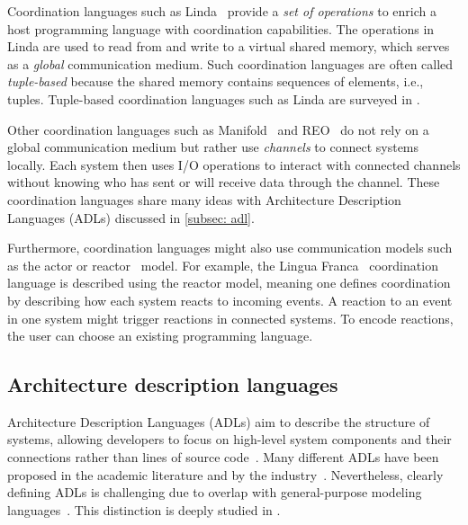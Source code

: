 \documentclass[runningheads]{llncs}
\begin{document}
Coordination languages such as Linda~\cite{carrieroLindaContext1989} provide a \textit{set of operations} to enrich a host programming language with coordination capabilities.
The operations in Linda are used to read from and write to a virtual shared memory, which serves as a \textit{global} communication medium.
Such coordination languages are often called \textit{tuple-based} because the shared memory contains sequences of elements, i.e., tuples.
Tuple-based coordination languages such as Linda are surveyed in \cite{rossiTuplebasedTechnologiesCoordination2001,nixonTuplespacebasedComputingSemantic2008,omiciniCoordinationModelsLanguages2011}.

Other coordination languages such as Manifold~\cite{arbabOverviewManifoldIts1993,papadopoulosModellingActivitiesInformation1998} and REO~\cite{arbabReoChannelbasedCoordination2004} do not rely on a global communication medium but rather use \textit{channels} to connect systems locally.
Each system then uses I/O operations to interact with connected channels without knowing who has sent or will receive data through the channel.
These coordination languages share many ideas with Architecture Description Languages (ADLs) discussed in \autoref{subsec: adl}.

Furthermore, coordination languages might also use communication models such as the actor or reactor~\cite{lohstrohReactorsDeterministicModel2020} model.
For example, the Lingua Franca~\cite{lohstrohReactorsDeterministicModel2020,lohstrohLinguaFrancaDeterministic2021} coordination language is described using the reactor model, meaning one defines coordination by describing how each system reacts to incoming events.
A reaction to an event in one system might trigger reactions in connected systems.
To encode reactions, the user can choose an existing programming language.

\subsection{Architecture description languages} \label{subsec: adl}
Architecture Description Languages (ADLs) aim to describe the structure of systems, allowing developers to focus on high-level system components and their connections rather than lines of source code~\cite{clementsSurveyArchitectureDescription1996,medvidovicClassificationComparisonFramework2000,medvidovicFrameworkClassifyingComparing1997}.
Many different ADLs have been proposed in the academic literature and by the industry~\cite{medvidovicClassificationComparisonFramework2000,woodsArchitectureDescriptionLanguages2005}.
Nevertheless, clearly defining ADLs is challenging due to overlap with general-purpose modeling languages~\cite{clementsSurveyArchitectureDescription1996}.
This distinction is deeply studied in \cite{medvidovicClassificationComparisonFramework2000}.
\end{document}
